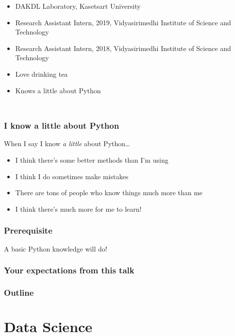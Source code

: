 \documentclass[aspectratio=169]{beamer}
\begin{document}
\begin{frame}
\begin{columns}
            \begin{itemize}
                \item DAKDL Laboratory, Kasetsart University
                \item Research Assistant Intern, 2019, Vidyasirimedhi Institute of Science and Technology
                \item Research Assistant Intern, 2018, Vidyasirimedhi Institute of Science and Technology
                \item Love drinking tea
                \item Knows a little about Python
            \end{itemize}
    \end{columns}
\end{frame}

\begin{frame}
    \frametitle{I know a little about Python}
    { When I say I know \textit{a little} about Python\dots}
    \begin{itemize}[<+(2)->]
        \item I think there's some better methods than I'm using
        \item I think I do sometimes make mistakes
        \item There are tons of people who know things much more than me
        \item I think there's much more for me to learn!
    \end{itemize}
\end{frame}

\begin{frame}
    \frametitle{Prerequisite}
    A basic Python knowledge will do!
\end{frame}

\begin{frame}
    \frametitle{Your expectations from this talk}
\end{frame}

\begin{frame}
	\frametitle{Outline}
    \tableofcontents
\end{frame}

\section{Data Science}
\end{document}
